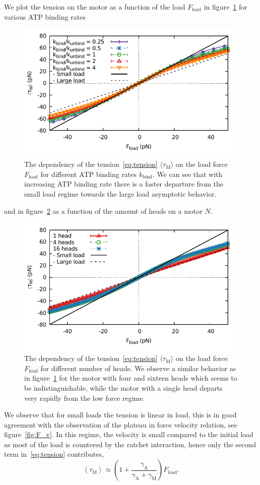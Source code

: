 \documentclass[aps,pre,twocolumn,showpacs,showkeys,superscriptaddress,floatfix]{revtex4-1}
\begin{document}
We plot the tension on the motor as a function of the load $F_\text{load}$ in figure~\ref{fig:tension} for various ATP binding rates 
\begin{figure}
\centering
\includegraphics[width=.45\textwidth,height=!]{tension.pdf}
\caption{\label{fig:tension}
The dependency of the tension~\eqref{eq:tension} $\langle \tau_\text{M}\rangle$ on the load force $F_\text{load}$ for different ATP binding rates $k_\text{bind}$.
We can see that with increasing ATP binding rate there is a faster departure from the small load regime towards the large load asymptotic behavior. 
}
\end{figure}
and in figure~\ref{fig:tension_heads} as a function of the amount of heads on a motor $N$. 
\begin{figure}
\centering
\includegraphics[width=.45\textwidth,height=!]{tension_heads.pdf}
\caption{\label{fig:tension_heads}
The dependency of the tension~\eqref{eq:tension} $\langle \tau_\text{M}\rangle$ on the load force $F_\text{load}$ for different number of heads. 
We observe a similar behavior as in figure~\ref{fig:tension} for the motor with four and sixteen heads which seems to be indistinguishable, 
while the motor with a single head departs very rapidly from the low force regime. 
}
\end{figure}
We observe that for small loads the tension is linear in load, this is in good agreement with the observation of the plateau in force velocity relation, 
see figure~\ref{fig:F_v}.
In this regime, the velocity is small compared to the initial load as most of the load is countered by the ratchet interaction, 
hence only the second term in~\eqref{eq:tension} contributes, 
\begin{equation}
\left\langle \tau_\text{M} \right\rangle
\approx
\left(1 + \frac{\gamma_\text{A}}{\gamma_\text{A}+\gamma_\text{M}} \right) F_\text{load}.
\label{eq:tension_low_load} 
\end{equation}
\end{document}
